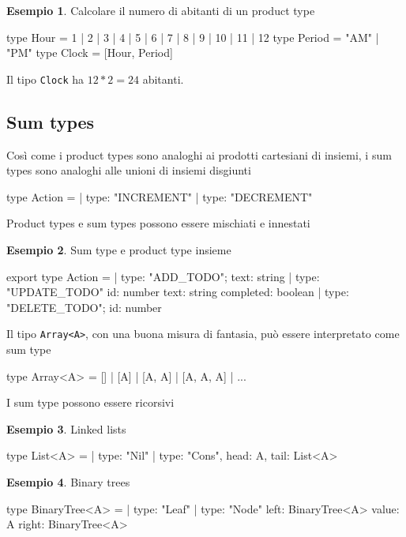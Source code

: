 \documentclass[12pt]{article}
\theoremstyle{definition}
\newtheorem{example}{Esempio}[subsection]
\newenvironment{code}
  {\vspace{0.5cm} \VerbatimEnvironment\begin{typescriptcode}}
  {\end{typescriptcode} \vspace{0.2cm}}
\begin{document}
\begin{example}
Calcolare il numero di abitanti di un product type

\begin{code}
type Hour = 1 | 2 | 3 | 4 | 5 | 6 | 7 | 8 | 9 | 10 | 11 | 12
type Period = "AM" | "PM"
type Clock = [Hour, Period]
\end{code}

Il tipo \texttt{Clock} ha $12 * 2 = 24$ abitanti.
\end{example}

\subsection{Sum types}

Così come i product types sono analoghi ai prodotti cartesiani di insiemi, i sum types sono analoghi alle unioni di insiemi disgiunti

\begin{code}
type Action =
  | { type: "INCREMENT" }
  | { type: "DECREMENT" }
\end{code}

Product types e sum types possono essere mischiati e innestati

\begin{example}
Sum type e product type insieme

\begin{code}
export type Action =
  | { type: "ADD_TODO"; text: string }
  | {
      type: "UPDATE_TODO"
      id: number
      text: string
      completed: boolean
    }
  | { type: "DELETE_TODO"; id: number }
\end{code}
\end{example}

Il tipo \texttt{Array<A>}, con una buona misura di fantasia, può essere interpretato come sum type

\begin{code}
type Array<A> = [] | [A] | [A, A] | [A, A, A] | ...
\end{code}

I sum type possono essere ricorsivi

\begin{example}
Linked lists

\begin{code}
type List<A> =
  | { type: "Nil" }
  | { type: "Cons", head: A, tail: List<A> }
\end{code}
\end{example}

\begin{example}
Binary trees

\begin{code}
type BinaryTree<A> =
  | { type: "Leaf" }
  | {
      type: "Node"
      left: BinaryTree<A>
      value: A
      right: BinaryTree<A>
    }
\end{code}
\end{example}
\end{document}
